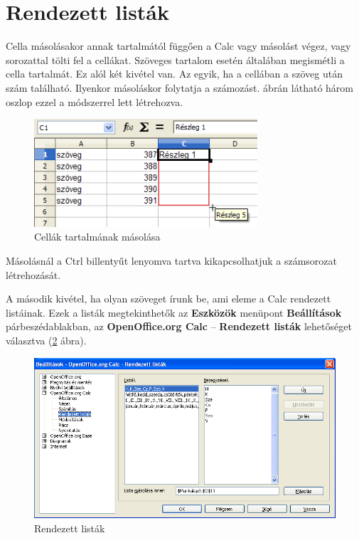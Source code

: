 \section{Rendezett listák }

Cella másolásakor annak tartalmától függően a Calc
vagy másolást végez, vagy sorozattal tölti fel a cellákat.
Szöveges tartalom esetén általában megismétli a cella
tartalmát. Ez alól két kivétel van. Az egyik, ha a cellában a
szöveg után szám található. Ilyenkor másoláskor folytatja
a számozást.  ábrán látható három oszlop ezzel a
módszerrel lett létrehozva.

\begin{figure}[!h]
\begin{center}
\includegraphics[width=8.312cm]{oocalcv2-img107.png}
\caption{Cellák tartalmának másolása}\label{CellákMásolása}
\end{center}
\end{figure}

Másolásnál a Ctrl billentyűt lenyomva tartva kikapcsolhatjuk a
számsorozat létrehozását.

A második kivétel, ha olyan szöveget írunk be, ami eleme a Calc
rendezett listáinak. Ezek a listák megtekinthetők az
\textbf{Eszközök} menüpont \textbf{Beállítások}
párbeszédablakban, az \textbf{OpenOffice.org Calc} --
\textbf{Rendezett listák} lehetőséget választva (\ref{RendezettListák}
ábra).

\begin{figure}[!h]
\begin{center}
\includegraphics[width=14.999cm]{oocalcv2-img108.png}
\caption{Rendezett listák}\label{RendezettListák}
\end{center}
\end{figure}

